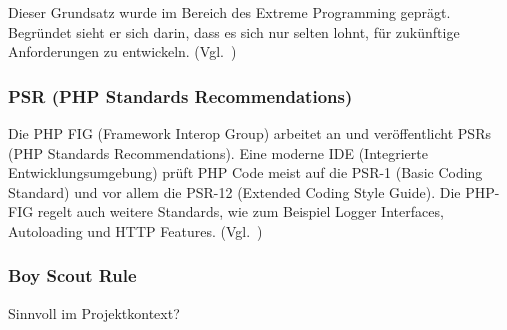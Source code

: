 Dieser Grundsatz wurde im Bereich des Extreme Programming geprägt.
Begründet sieht er sich darin, dass es sich nur selten lohnt, für zukünftige Anforderungen zu entwickeln.
(Vgl.~\cite{kiss-principle-explained})

\subsubsection{PSR (PHP Standards Recommendations)}
Die PHP FIG (Framework Interop Group) arbeitet an und veröffentlicht PSRs (PHP Standards Recommendations).
Eine moderne IDE (Integrierte Entwicklungsumgebung) prüft PHP Code meist auf die PSR-1 (Basic Coding Standard) und vor allem die PSR-12 (Extended Coding Style Guide).
Die PHP-FIG regelt auch weitere Standards, wie zum Beispiel Logger Interfaces, Autoloading und HTTP Features.
(Vgl.~\cite{psr})

\subsubsection{Boy Scout Rule}
Sinnvoll im Projektkontext?
